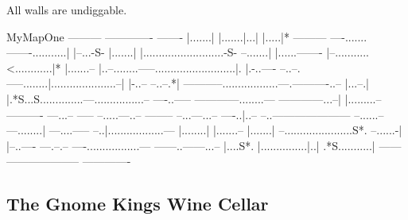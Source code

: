 All walls are undiggable.

\begin{SaveVerbatim}{MyMapOne}
                         ---------     -------------       -------
                         |.......|     |.......|...|       |.....|*
     ---------        ----.......-------...........|       |--...-S-
     |.......|        |..........................-S-      --.......|
     |......-------   |--...........<............|*       |.......--
     |..--........-----..........................|.       |.-..----
     --..--.-----........|.....................--|        |-..--
      --..--.*| -----------..................---.----------..--
       |...--.|    |.*S...S..............---................--
      ----..-----  ------------........--- ------------...--|
      |.........--            ----------              ---...-- -----
     --.....---..--                           --------  --...---...--
  ----..|..-- --..---------------------      --......--  ---........|
---....-----   --..|..................---    |........|    |.......--
|.......|       --......................S*.  --......-|    |--..---- 
---.--.--        ----.................---     ------..------...--    
  |....S*.          |...............|..|         .*S...........|     
  ------            --------------------           -------------  
\end{SaveVerbatim}
\subsection{The Gnome King\textquotesingle{}s Wine Cellar}

